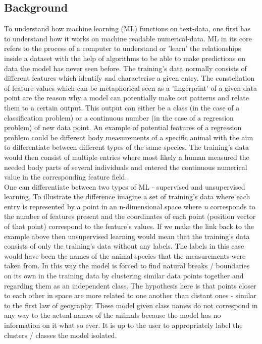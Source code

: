 \subsection{Background}
To understand how machine learning (ML) functions on text-data, one first has to understand how it works on machine readable numerical-data. ML in its core refers to the process of a computer to understand or 'learn' the relationships inside a dataset with the help of algorithms to be able to make predictions on data the model has never seen before. The training's data normally consists of different features which identify and characterise a given entry. The constellation of feature-values which can be metaphorical seen as a 'fingerprint' of a given data point are the reason why a model can potentially make out patterns and relate them to a certain output. This output can either be a class (in the case of a classification problem) or a continuous number (in the case of a regression problem) of new data point. An example of potential features of a regression problem could be different body measurements of a specific animal with the aim to differentiate between different types of the same species. The training's data would then consist of multiple entries where most likely a human measured the needed body parts of several individuals and entered the continuous numerical value in the corresponding feature field.\\
One can differentiate between two types of ML - supervised and unsupervised learning. To illustrate the difference imagine a set of training's data where each entry is represented by a point in an n-dimensional space where \textit{n} corresponds to the number of features present and the coordinates of each point (position vector of that point) correspond to the feature's values. If we make the link back to the example above then unsupervised learning would mean that the training's data consists of only the training's data without any labels. The labels in this case would have been the names of the animal species that the measurements were taken from. In this way the model is forced to find natural breaks / boundaries on its own in the training data by clustering similar data points together and regarding them as an independent class. The hypothesis here is that points closer to each other in space are more related to one another than distant ones - similar to the first law of geography. These model given class names do not correspond in any way to the actual names of the animals because the model has no information on it what so ever. It is up to the user to appropriately label the clusters / classes the model isolated.

